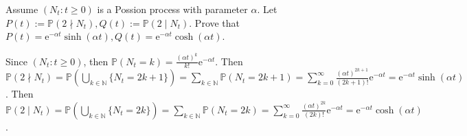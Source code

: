 \documentclass{ctexart}
\newif\ifpreface
\begin{document}
\large
\setlength{\baselineskip}{1.2em}
\ifpreface
  
\else
\fi
{}
\begin{problem}\label{pro:1}
  Assume \((N_t:t \geq 0)\) is a Possion process with parameter \(\alpha\).
  Let \(P(t):=\mathbb{P}(2 \nmid N_t),Q(t):=\mathbb{P}(2 \mid N_t)\).
  Prove that \(P(t)=\mathrm{e}^{-\alpha t}\sinh(\alpha t),Q(t)=\mathrm{e}^{-\alpha t}\cosh(\alpha t)\).
\end{problem}
\begin{solution}
  Since \((N_t: t \geq 0)\), then \(\mathbb{P}(N_t=k)=\frac{(\alpha t)^k}{k!}\mathrm{e}^{-\alpha t}\).
  Then \(\mathbb{P}(2 \nmid N_t)=\mathbb{P}(\bigcup_{k \in \mathbb{N}}\{N_t=2k + 1\})=\sum_{k \in \mathbb{N}}\mathbb{P}(N_t=2k + 1)=\sum_{k=0}^{\infty}\frac{(\alpha t)^{2k + 1}}{(2k + 1)!}\mathrm{e}^{-\alpha t}=\mathrm{e}^{-\alpha t}\sinh(\alpha t)\).
  Then \(\mathbb{P}(2 \mid N_t)=\mathbb{P}(\bigcup_{k \in \mathbb{N}}\{N_t=2k\})=\sum_{k \in \mathbb{N}}\mathbb{P}(N_t=2k)=\sum_{k=0}^{\infty}\frac{(\alpha t)^{2k}}{(2k)!}\mathrm{e}^{-\alpha t}=\mathrm{e}^{-\alpha t}\cosh(\alpha t)\).
\end{solution}
\end{document}

